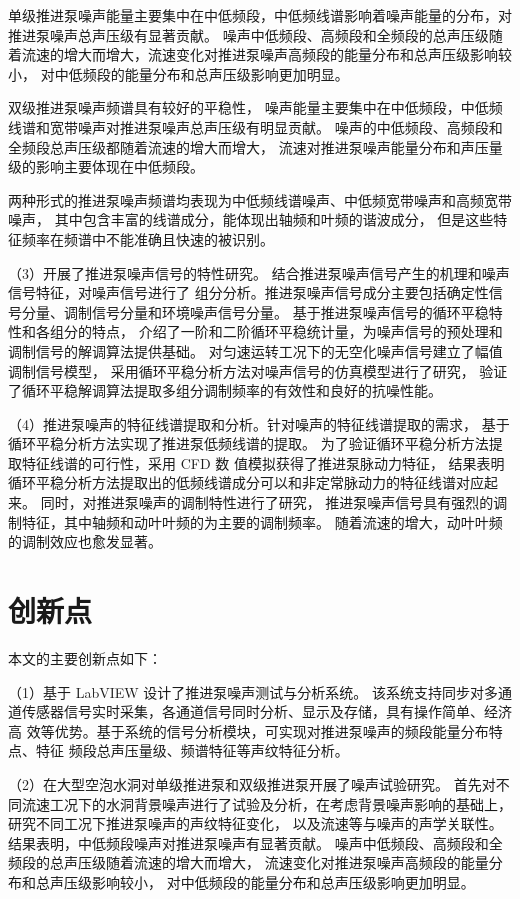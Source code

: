 单级推进泵噪声能量主要集中在中低频段，中低频线谱影响着噪声能量的分布，对推进泵噪声总声压级有显著贡献。
噪声中低频段、高频段和全频段的总声压级随着流速的增大而增大，流速变化对推进泵噪声高频段的能量分布和总声压级影响较小，
对中低频段的能量分布和总声压级影响更加明显。

双级推进泵噪声频谱具有较好的平稳性，
噪声能量主要集中在中低频段，中低频线谱和宽带噪声对推进泵噪声总声压级有明显贡献。
噪声的中低频段、高频段和全频段总声压级都随着流速的增大而增大，
流速对推进泵噪声能量分布和声压量级的影响主要体现在中低频段。

两种形式的推进泵噪声频谱均表现为中低频线谱噪声、中低频宽带噪声和高频宽带噪声，
其中包含丰富的线谱成分，能体现出轴频和叶频的谐波成分，
但是这些特征频率在频谱中不能准确且快速的被识别。

（3）开展了推进泵噪声信号的特性研究。
结合推进泵噪声信号产生的机理和噪声信号特征，对噪声信号进行了
组分分析。推进泵噪声信号成分主要包括确定性信号分量、调制信号分量和环境噪声信号分量。
基于推进泵噪声信号的循环平稳特性和各组分的特点，
介绍了一阶和二阶循环平稳统计量，为噪声信号的预处理和调制信号的解调算法提供基础。
对匀速运转工况下的无空化噪声信号建立了幅值调制信号模型，
采用循环平稳分析方法对噪声信号的仿真模型进行了研究，
验证了循环平稳解调算法提取多组分调制频率的有效性和良好的抗噪性能。
 
（4）推进泵噪声的特征线谱提取和分析。针对噪声的特征线谱提取的需求，
基于循环平稳分析方法实现了推进泵低频线谱的提取。
为了验证循环平稳分析方法提取特征线谱的可行性，采用 CFD 数
值模拟获得了推进泵脉动力特征，
结果表明循环平稳分析方法提取出的低频线谱成分可以和非定常脉动力的特征线谱对应起来。
同时，对推进泵噪声的调制特性进行了研究，
推进泵噪声信号具有强烈的调制特征，其中轴频和动叶叶频的为主要的调制频率。
随着流速的增大，动叶叶频的调制效应也愈发显著。
\section{创新点}
本文的主要创新点如下：

（1）基于 LabVIEW 设计了推进泵噪声测试与分析系统。
该系统支持同步对多通道传感器信号实时采集，各通道信号同时分析、显示及存储，具有操作简单、经济高
效等优势。基于系统的信号分析模块，可实现对推进泵噪声的频段能量分布特点、特征
频段总声压量级、频谱特征等声纹特征分析。

（2）在大型空泡水洞对单级推进泵和双级推进泵开展了噪声试验研究。
首先对不同流速工况下的水洞背景噪声进行了试验及分析，在考虑背景噪声影响的基础上，
研究不同工况下推进泵噪声的声纹特征变化，
以及流速等与噪声的声学关联性。
结果表明，中低频段噪声对推进泵噪声有显著贡献。
噪声中低频段、高频段和全频段的总声压级随着流速的增大而增大，
流速变化对推进泵噪声高频段的能量分布和总声压级影响较小，
对中低频段的能量分布和总声压级影响更加明显。


